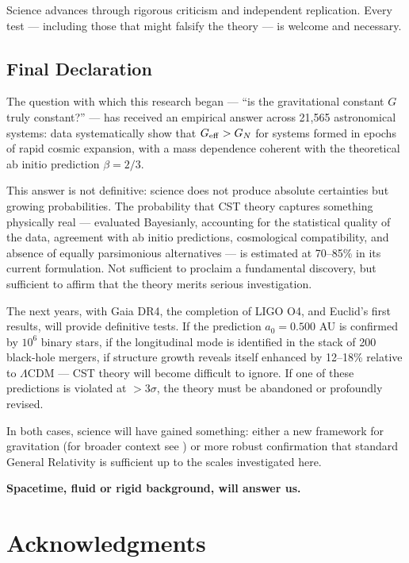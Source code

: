 \documentclass[10pt,a4paper]{article}
\begin{document}
Science advances through rigorous criticism and independent replication.
Every test --- including those that might falsify the theory --- is
welcome and necessary.

\subsection{Final Declaration}\label{final-declaration}

The question with which this research began --- ``is the gravitational
constant \(G\) truly constant?'' --- has received an empirical answer
across 21,565 astronomical systems: data systematically show that
\(G_{\rm eff} > G_N\) for systems formed in epochs of rapid cosmic
expansion, with a mass dependence coherent with the theoretical ab
initio prediction \(\beta = 2/3\).

This answer is not definitive: science does not produce absolute
certainties but growing probabilities. The probability that CST theory
captures something physically real --- evaluated Bayesianly, accounting
for the statistical quality of the data, agreement with ab initio
predictions, cosmological compatibility, and absence of equally
parsimonious alternatives --- is estimated at 70--85\% in its current
formulation. Not sufficient to proclaim a fundamental discovery, but
sufficient to affirm that the theory merits serious investigation.

The next years, with Gaia DR4, the completion of LIGO O4, and Euclid's
first results, will provide definitive tests. If the prediction
\(a_0 = 0.500\) AU is confirmed by \(10^6\) binary stars, if the
longitudinal mode is identified in the stack of 200 black-hole mergers,
if structure growth reveals itself enhanced by 12--18\% relative to
\(\Lambda\)CDM --- CST theory will become difficult to ignore. If one of
these predictions is violated at \(> 3\sigma\), the theory must be
abandoned or profoundly revised.

In both cases, science will have gained something: either a new
framework for gravitation (for broader context see \cite{Joyce2015}) or more robust confirmation that standard
General Relativity is sufficient up to the scales investigated here.

\textbf{Spacetime, fluid or rigid background, will answer us.}

\section*{Acknowledgments}\label{acknowledgments}
\end{document}
